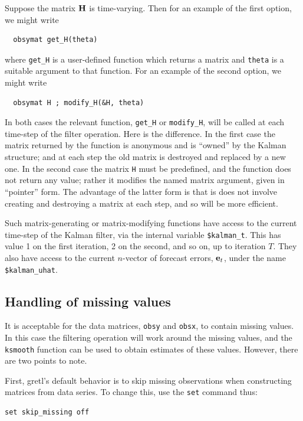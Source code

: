 \documentclass[a4paper]{article}
\newcommand{\obsmat}{\ensuremath\mathbf{H}}
\newcommand{\prederr}{\ensuremath\mathbf{e}}
\begin{document}
Suppose the matrix $\obsmat$ is time-varying.  Then for an example of
the first option, we might write
%
\begin{verbatim}
  obsymat get_H(theta)
\end{verbatim}
%
where \texttt{get\_H} is a user-defined function which returns a
matrix and \texttt{theta} is a suitable argument to that function.
For an example of the second option, we might write
%
\begin{verbatim}
  obsymat H ; modify_H(&H, theta)
\end{verbatim}

In both cases the relevant function, \verb+get_H+ or \verb+modify_H+,
will be called at each time-step of the filter operation.  Here is the
difference. In the first case the matrix returned by the function is
anonymous and is ``owned'' by the Kalman structure; and at each step
the old matrix is destroyed and replaced by a new one.  In the second
case the matrix \texttt{H} must be predefined, and the function does
not return any value; rather it modifies the named matrix argument,
given in ``pointer'' form.  The advantage of the latter form is that
is does not involve creating and destroying a matrix at each step, and
so will be more efficient.

Such matrix-generating or matrix-modifying functions have access to
the current time-step of the Kalman filter, via the internal variable
\verb+$kalman_t+.  This has value 1 on the first iteration, 2 on the
second, and so on, up to iteration $T$.  They also have access to
the current $n$-vector of forecast errors, $\prederr_t$, under the
name \verb+$kalman_uhat+.


\subsection{Handling of missing values}

It is acceptable for the data matrices, \texttt{obsy} and
\texttt{obsx}, to contain missing values.  In this case the filtering
operation will work around the missing values, and the \texttt{ksmooth}
function can be used to obtain estimates of these values.  However,
there are two points to note.

First, gretl's default behavior is to skip missing observations when
constructing matrices from data series.  To change this, use the \texttt{set} 
command thus:
%
\begin{verbatim}
set skip_missing off
\end{verbatim}
\end{document}
